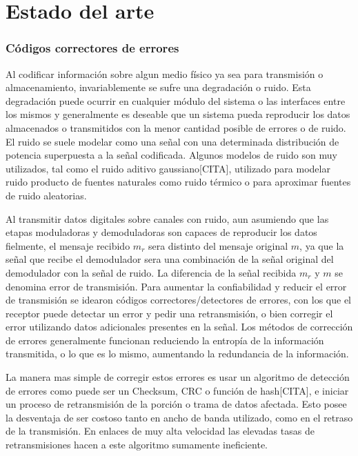 \chapter{Estado del arte}

\subsection{Códigos correctores de errores}
Al codificar información sobre algun medio físico ya sea para transmisión o almacenamiento, invariablemente se sufre una degradación o ruido. Esta degradación puede ocurrir en cualquier módulo del sistema o las interfaces entre los mismos y generalmente es deseable que un sistema pueda reproducir los datos almacenados o transmitidos con la menor cantidad posible de errores o de ruido. El ruido se suele modelar como una señal con una determinada distribución de potencia superpuesta a la señal codificada. Algunos modelos de ruido son muy utilizados, tal como el ruido aditivo gaussiano[CITA], utilizado para modelar ruido producto de fuentes naturales como ruido térmico o para aproximar fuentes de ruido aleatorias.


Al transmitir datos digitales sobre canales con ruido, aun asumiendo que las etapas moduladoras y demoduladoras son capaces de reproducir los datos fielmente, el mensaje recibido $m_r$ sera distinto del mensaje original $m$, ya que la señal que recibe el demodulador sera una combinación de la señal original del demodulador con la señal de ruido. La diferencia de la señal recibida $m_r$ y $m$ se denomina error de transmisión. Para aumentar la confiabilidad y reducir el error de transmisión se idearon códigos correctores/detectores de errores, con los que el receptor puede detectar un error y pedir una retransmisión, o bien corregir el error utilizando datos adicionales presentes en la señal. Los métodos de corrección de errores generalmente funcionan reduciendo la entropía de la información transmitida, o lo que es lo mismo, aumentando la redundancia de la información.

La manera mas simple de corregir estos errores es usar un algoritmo de detección de errores como puede ser un Checksum, CRC o función de hash[CITA], e iniciar un proceso de retransmisión de la porción o trama de datos afectada. Esto posee la desventaja de ser costoso tanto en ancho de banda utilizado, como en el retraso de la transmisión. En enlaces de muy alta velocidad las elevadas tasas de retransmisiones hacen a este algoritmo sumamente ineficiente. 

